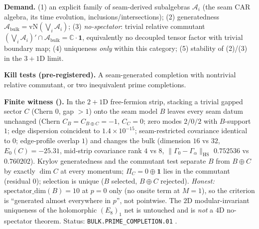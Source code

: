 \documentclass[11pt,a4paper]{article}
\begin{document}
\par\smallskip\noindent\textbf{Demand.} (1) an explicit family of seam-derived subalgebras
$\mathcal A_i$ (the seam CAR algebra, its time evolution, inclusions/intersections);
(2) generatedness $\mathcal A_{\mathrm{bulk}}=\mathrm{vN}(\bigvee_i\mathcal A_i)$;
(3) \emph{no-spectator}: trivial relative commutant
$(\bigvee_i\mathcal A_i)'\cap\mathcal A_{\mathrm{bulk}}=\mathbb C\cdot\mathbf 1$,
equivalently no decoupled tensor factor with trivial boundary map; (4) uniqueness
\emph{only} within this category; (5) stability of (2)/(3) in the $3{+}1$D limit.

\par\smallskip\noindent\textbf{Kill tests (pre-registered).} A seam-generated completion
with nontrivial relative commutant, or two inequivalent prime completions.

\par\smallskip\noindent\textbf{Finite witness ().}
In the $2{+}1$D free-fermion strip, stacking a trivial gapped sector $C$ (Chern $0$,
gap $>1$) onto the seam model $B$ leaves every seam datum unchanged (Chern
$C_B=C_{B\oplus C}=-1$, $C_C=0$; zero modes $2/0/2$ with $B$-support $1$; edge
dispersion coincident to $1.4{\times}10^{-15}$; seam-restricted covariance identical to
$0$; edge-profile overlap $1$) and changes the bulk (dimension $16$ vs $32$,
$E_0(C)=-25.31$, mid-strip covariance rank $4$ vs $8$,
$\|\Gamma_0-\Gamma_\alpha\|_{\mathrm{HS}}$ $0.752536$ vs $0.760202$).  Krylov
generatedness and the commutant test separate $B$ from $B\oplus C$ by exactly $\dim C$
at every momentum; $\Pi_C=0\oplus\mathbf 1$ lies in the commutant (residual $0$); selection
is unique ($B$ selected, $B\oplus C$ rejected).  \emph{Honest:}
$\mathrm{spectator\_dim}(B)=10$ at $p=0$ only (no onsite term at $M=1$), so the
criterion is ``generated almost everywhere in $p$'', not pointwise.  The $2$D
modular-invariant uniqueness of the holomorphic $(E_8)_1$ net is untouched and is
\emph{not} a $4$D no-spectator theorem.  Status: \texttt{BULK.PRIME\_COMPLETION.01} \mO.

\end{document}

